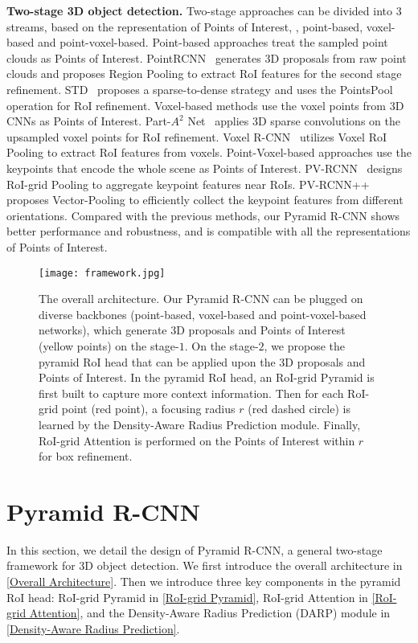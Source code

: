 \documentclass[10pt,twocolumn,letterpaper]{article}
\begin{document}
\noindent\textbf{Two-stage 3D object detection.} Two-stage approaches can be divided into $3$ streams, based on the representation of Points of Interest, \ie, point-based, voxel-based and point-voxel-based. Point-based approaches treat the sampled point clouds as Points of Interest. PointRCNN~\cite{shi2019pointrcnn} generates 3D proposals from raw point clouds and proposes Region Pooling to extract RoI features for the second stage refinement. STD~\cite{yang2019std} proposes a sparse-to-dense strategy and uses the PointsPool operation for RoI refinement. Voxel-based methods use the voxel points from 3D CNNs as Points of Interest. Part-$A^{2}$ Net~\cite{shi2020points} applies 3D sparse convolutions on the upsampled voxel points for RoI refinement. Voxel R-CNN~\cite{deng2020voxel} utilizes Voxel RoI Pooling to extract RoI features from voxels. Point-Voxel-based approaches use the keypoints that encode the whole scene as Points of Interest. PV-RCNN~\cite{shi2020pv} designs RoI-grid Pooling to aggregate keypoint features near RoIs. PV-RCNN++~\cite{shi2021pv} proposes Vector-Pooling to efficiently collect the keypoint features from different orientations. Compared with the previous methods, our Pyramid R-CNN shows better performance and robustness, and is compatible with all the representations of Points of Interest.

\begin{figure*}[!t]
\vspace{-6mm}
\centering
\texttt{[image: framework.jpg]}
\vspace{-5mm}
\caption{The overall architecture. Our Pyramid R-CNN can be plugged on diverse backbones (\eg point-based, voxel-based and point-voxel-based networks), which generate 3D proposals and Points of Interest (yellow points) on the stage-$1$. On the stage-$2$, we propose the pyramid RoI head that can be applied upon the 3D proposals and Points of Interest. In the pyramid RoI head, an RoI-grid Pyramid is first built to capture more context information. Then for each RoI-grid point (red point), a focusing radius $r$ (red dashed circle) is learned by the Density-Aware Radius Prediction module. Finally, RoI-grid Attention is performed on the Points of Interest within $r$ for box refinement.}
\label{fig_framework}
\vspace{-2mm}
\end{figure*}

\section{Pyramid R-CNN}
In this section, we detail the design of Pyramid R-CNN, a general two-stage framework for 3D object detection. We first introduce the overall architecture in \ref{Overall Architecture}. Then we introduce three key components in the pyramid RoI head: RoI-grid Pyramid in \ref{RoI-grid Pyramid}, RoI-grid Attention in \ref{RoI-grid Attention}, and the Density-Aware Radius Prediction (DARP) module in \ref{Density-Aware Radius Prediction}.
\end{document}
